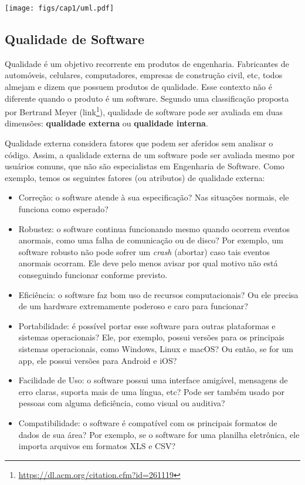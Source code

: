 \documentclass[
  11pt,
  twoside]{book}
\DeclareRobustCommand{\href}[2]{#2\footnote{\url{#1}}}
\let\origfigure\figure
\let\endorigfigure\endfigure
\renewenvironment{figure}[1][2] {
    \expandafter\origfigure\expandafter[!h]
} {
    \endorigfigure
}
\begin{document}
\begin{figure}
\centering
\texttt{[image: figs/cap1/uml.pdf]}
\caption{Exemplo de Diagrama de Classe UML}
\end{figure}

\hypertarget{qualidade-de-software}{%
\subsection{Qualidade de Software}\label{qualidade-de-software}}

 Qualidade é um objetivo recorrente em
produtos de engenharia. Fabricantes de automóveis, celulares,
computadores, empresas de construção civil, etc, todos almejam e dizem
que possuem produtos de qualidade. Esse contexto não é diferente quando
o produto é um software. Segundo uma classificação proposta por Bertrand
Meyer (\href{https://dl.acm.org/citation.cfm?id=261119}{link}),
qualidade de software pode ser avaliada em duas dimensões:
\textbf{qualidade externa} ou \textbf{qualidade interna}.

 Qualidade externa considera
fatores que podem ser aferidos sem analisar o código. Assim, a qualidade
externa de um software pode ser avaliada mesmo por usuários comuns, que
não são especialistas em Engenharia de Software. Como exemplo, temos os
seguintes fatores (ou atributos) de qualidade externa:

\begin{itemize}
\item
  Correção: o software atende à sua especificação? Nas situações
  normais, ele funciona como esperado?
\item
  Robustez: o software continua funcionando mesmo quando ocorrem eventos
  anormais, como uma falha de comunicação ou de disco? Por exemplo, um
  software robusto não pode sofrer um \emph{crash} (abortar) caso tais
  eventos anormais ocorram. Ele deve pelo menos avisar por qual motivo
  não está conseguindo funcionar conforme previsto.
\item
  Eficiência: o software faz bom uso de recursos computacionais? Ou ele
  precisa de um hardware extremamente poderoso e caro para funcionar?
\item
  Portabilidade: é possível portar esse software para outras plataformas
  e sistemas operacionais? Ele, por exemplo, possui versões para os
  principais sistemas operacionais, como Windows, Linux e macOS? Ou
  então, se for um app, ele possui versões para Android e iOS?
\item
  Facilidade de Uso: o software possui uma interface amigável, mensagens
  de erro claras, suporta mais de uma língua, etc? Pode ser também usado
  por pessoas com alguma deficiência, como visual ou auditiva?
\item
  Compatibilidade: o software é compatível com os principais formatos de
  dados de sua área? Por exemplo, se o software for uma planilha
  eletrônica, ele importa arquivos em formatos XLS e CSV?
\end{itemize}
\end{document}
